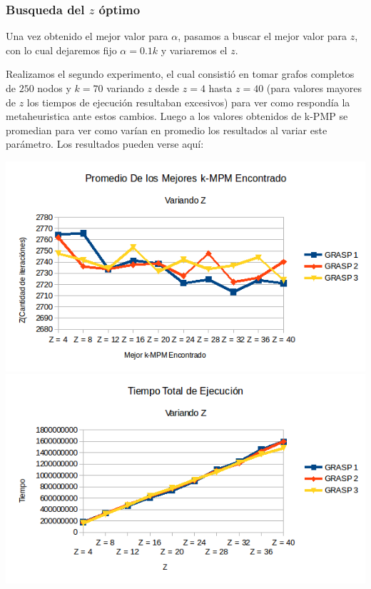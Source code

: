 \subsubsection{Busqueda del $z$ óptimo}

Una vez obtenido el mejor valor para $\alpha$, pasamos a buscar el mejor valor para $z$, con lo cual dejaremos fijo $\alpha=0.1k$ y variaremos el $z$.

Realizamos el segundo experimento, el cual consistió en tomar grafos completos de $250$ nodos y $k = 70$ variando $z$ desde $z = 4$ hasta $z = 40$ (para valores mayores de $z$ los tiempos de ejecución resultaban excesivos) para ver como respondía la metaheuristica ante estos cambios. Luego a los valores obtenidos de k-PMP se promedian para ver como varían en promedio los resultados al variar este parámetro.
Los resultados pueden verse aquí:

\includegraphics[scale=0.7]{Ej5/promedioZ.png}\\

\includegraphics[scale=0.7]{Ej5/tiemposZ.png}\\

